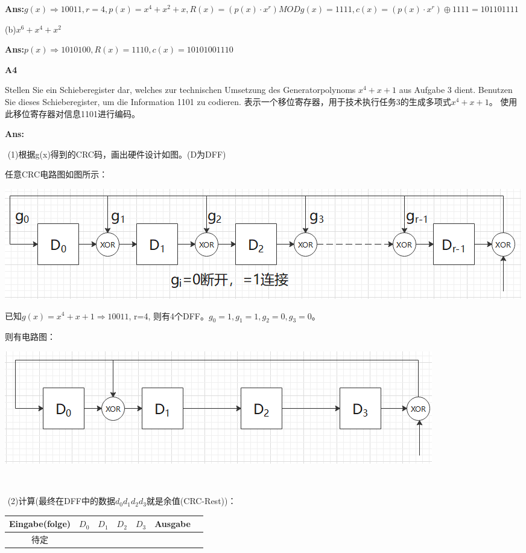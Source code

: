\documentclass[fleqn]{article}
\begin{document}
\textbf{Ans:}$g(x)\Rightarrow 10011,r=4,p(x)=x^4+x^2+x,R(x)=(p(x)\cdot x^r)MOD g(x)=1111,c(x)=(p(x)\cdot x^r)\oplus 1111=101101111$

(b)$x^6+x^4+x^2$

\textbf{Ans:}$p(x)\Rightarrow 1010100,R(x)=1110,c(x)=10101001110$

\noindent\textbf{A4}

Stellen Sie ein Schieberegister dar, welches zur technischen Umsetzung des Generatorpolynoms $x^4+x+1$ aus Aufgabe 3 dient. Benutzen Sie dieses Schieberegister, um die Information 1101 zu codieren.
表示一个移位寄存器，用于技术执行任务3的生成多项式$ x ^ 4 + x + 1 $。 使用此移位寄存器对信息1101进行编码。

\textbf{Ans:}

\quad \quad \,\,(1)根据g(x)得到的CRC码，画出硬件设计如图。(D为DFF)

任意CRC电路图如图所示：
\begin{center}
    \includegraphics[scale=0.4]{bild13.png}
\end{center}

\indent\indent 已知$g(x)=x ^ 4 + x + 1 \Rightarrow 10011$, r=4, 则有4个DFF。$g_0=1, g_1=1, g_2=0, g_3=0$。

\indent\indent 则有电路图：

\begin{center}
    \includegraphics[scale=0.4]{bild14.png}
\end{center}

\quad \quad \,\,

\quad \quad \,\,(2)计算(最终在DFF中的数据$d_0d_1d_2d_3$就是余值(CRC-Rest))：

\begin{center}
    \begin{tabular}{c|c|c|c|c|c|c}
        Eingabe(folge)&$D_0$&$D_1$&$D_2$&$D_3$&Ausgabe&\\
        \hline
        待定
    \end{tabular}
\end{center}
\end{document}
